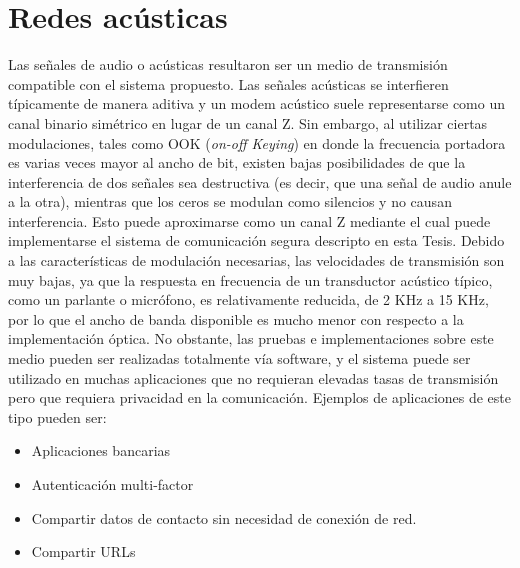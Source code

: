 \section{Redes acústicas}
\label{redacus}

Las señales de audio o acústicas resultaron ser un medio de transmisión compatible con el sistema propuesto. Las señales acústicas se interfieren típicamente de manera aditiva y un modem acústico suele representarse como un canal binario simétrico en lugar de un canal Z. Sin embargo, al utilizar ciertas modulaciones, tales como OOK (\textit{on-off Keying}) en donde la frecuencia portadora es varias veces mayor al ancho de bit, existen bajas posibilidades de que la interferencia de dos señales sea destructiva (es decir, que una señal de audio anule a la otra), mientras que los ceros se modulan como silencios y no causan interferencia. Esto puede aproximarse como un canal Z mediante el cual puede implementarse el sistema de comunicación segura descripto en esta Tesis. Debido a las características de modulación necesarias, las velocidades de transmisión son muy bajas, ya que la respuesta en frecuencia de un transductor acústico típico, como un parlante o micrófono, es relativamente reducida, de 2 KHz a 15 KHz, por lo que el ancho de banda disponible es mucho menor con respecto a la implementación óptica.
No obstante, las pruebas e implementaciones sobre este medio pueden ser realizadas totalmente vía software, y el sistema puede ser utilizado en muchas aplicaciones que no requieran elevadas tasas de transmisión pero que requiera privacidad en la comunicación. Ejemplos de aplicaciones de este tipo pueden ser:
\begin{itemize}
 \item Aplicaciones bancarias
 \item Autenticación multi-factor
 \item Compartir datos de contacto sin necesidad de conexión de red.
 \item Compartir URLs
\end{itemize}


